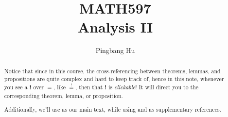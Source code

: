 \documentclass[a4paper]{article}
\author{Pingbang Hu}
\title{MATH597\\Analysis II}
\begin{document}
\maketitle

\begin{abstract}
	Notice that since in this course, the cross-referencing between theorems, lemmas, and propositions are quite complex and
	hard to keep track of, hence in this note, whenever you see a \textbf{!} over \(=\), like \(\overset{!}{=}\), then that
	\textbf{!} is \emph{clickable}! It will direct you to the corresponding theorem, lemma, or proposition.

	\par Additionally, we'll use \cite{folland1999real} as our main text, while using \cite{tao2013introduction} and
	\cite{axler2019measure} as supplementary references.
\end{abstract}

\tableofcontents


\newpage
\appendix
\appendixpage



\newpage
\printbibliography
\end{document}
